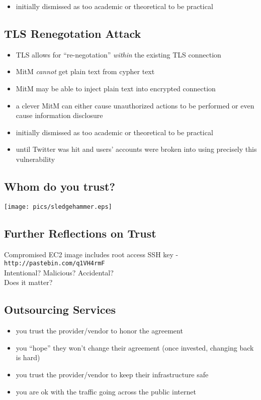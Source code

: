 \documentclass[xga]{xdvislides}
\begin{document}
\begin{itemize}
	\item initially dismissed as too academic or theoretical to be practical
\end{itemize}

\subsection{TLS Renegotation Attack}
\begin{itemize}
	\item TLS allows for ``re-negotation'' {\em within} the existing TLS
		connection
	\item MitM {\em cannot} get plain text from cypher text
	\item MitM may be able to inject plain text into encrypted connection
	\item a clever MitM can either cause unauthorized actions to be performed
		or even cause information disclosure
\end{itemize}
\addvspace{.5in}

\begin{itemize}
	\item initially dismissed as too academic or theoretical to be practical
	\item until Twitter was hit and users' accounts were broken into using
		precisely this vulnerability
\end{itemize}

\subsection{Whom do you trust?}
\begin{center}
	\texttt{[image: pics/sledgehammer.eps]}
\end{center}

\subsection{Further Reflections on Trust}
Compromised EC2 image includes root access SSH key -
{\tt http://pastebin.com/q1VH4rmF}
\\

Intentional? Malicious? Accidental?
\\

Does it matter?

\subsection{Outsourcing Services}
\begin{itemize}
	\item you trust the provider/vendor to honor the agreement
	\item you ``hope'' they won't change their agreement (once
		invested, changing back is hard)
	\item you trust the provider/vendor to keep their infrastructure
		safe
	\item you are ok with the traffic going across the public internet
\end{itemize}
\end{document}
